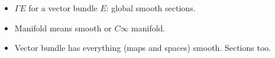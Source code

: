 \begin{itemize}
    \item $\Gamma E$ for a vector bundle $E$: global smooth sections.
    
    \item Manifold means smooth or $C\infty$ manifold.
    
    \item Vector bundle has everything (maps and spaces) smooth. Sections too.
\end{itemize}